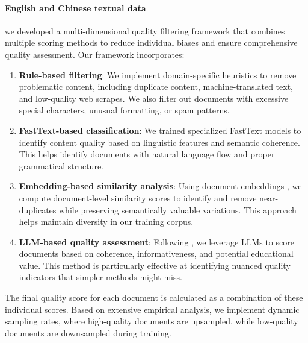 \documentclass{article}
\newcommand{\citep}[1]{\parencite{#1}}
\begin{document}
\paragraph{English and Chinese textual data} we developed a multi-dimensional quality filtering framework that combines multiple scoring methods to reduce individual biases and ensure comprehensive quality assessment. Our framework incorporates:\begin{enumerate}
   \item \textbf{Rule-based filtering}: We implement domain-specific heuristics to remove problematic content, including duplicate content, machine-translated text, and low-quality web scrapes. We also filter out documents with excessive special characters, unusual formatting, or spam patterns.
   
   \item \textbf{FastText-based classification}: We trained specialized FastText\citep{joulin2016bag,li2024datacomp} models to identify content quality based on linguistic features and semantic coherence. This helps identify documents with natural language flow and proper grammatical structure.

   \item \textbf{Embedding-based similarity analysis}: Using document embeddings \citep{chen2024bge}, we compute document-level similarity scores to identify and remove near-duplicates while preserving semantically valuable variations. This approach helps maintain diversity in our training corpus.
   
   \item \textbf{LLM-based quality assessment}: Following \citep{penedo2024fineweb}, we leverage LLMs to score documents based on coherence, informativeness, and potential educational value. This method is particularly effective at identifying nuanced quality indicators that simpler methods might miss.
\end{enumerate}
The final quality score for each document is calculated as a combination of these individual scores. Based on extensive empirical analysis, we implement dynamic sampling rates, where high-quality documents are upsampled, while low-quality documents are downsampled during training. 
\end{document}
